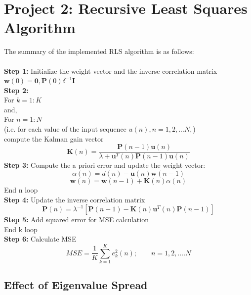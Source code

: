 \documentclass[journal]{IEEEtran}
\begin{document}
\section{Project 2: Recursive Least Squares Algorithm}
The summary of the implemented RLS algorithm is as follows:\\
\\
\textbf{Step 1:} Initialize the weight vector and the inverse correlation matrix
$\boldsymbol{w}(0) = \boldsymbol{0},  \boldsymbol{P}(0) \delta^{-1}\boldsymbol{I}$\\
\textbf{Step 2:}\\
For $k = 1:K$\\
and,\\
For $n = 1:N$\\
(i.e. for each value of the input sequence $u(n), n = 1,2,...N,$)
\\ \indent compute the Kalman gain vector
\begin{equation}
  \boldsymbol{K}(n)= \dfrac{\boldsymbol{P}(n-1)\boldsymbol{u}(n)}{\lambda+\boldsymbol{u}^T(n)\boldsymbol{P}(n-1)\boldsymbol{u}(n)}
\end{equation}
\indent \textbf{Step 3:} Compute the a priori error and update the weight vector:
\begin{equation}
  \alpha(n) = d(n) - \boldsymbol{u}(n)\boldsymbol{w}(n-1)
\end{equation}
\begin{equation}
  \boldsymbol{w}(n)= \boldsymbol{w}(n-1)+\boldsymbol{K}(n)\alpha(n)
\end{equation}
End n loop\\
\indent \textbf{Step 4:} Update the inverse correlation matrix
\begin{equation}
  \boldsymbol{P}(n)= \lambda^{-1}[\boldsymbol{P}(n-1)-\boldsymbol{K}(n)\boldsymbol{u}^T(n)\boldsymbol{P}(n-1)]
\end{equation}
\textbf{Step 5:} Add squared error for MSE calculation\\
End k loop\\
\textbf{Step 6:} Calculate MSE
\begin{equation}
  \label{eq:MSE}
  MSE=\dfrac{1}{K}\sum_{k=1}^{K}e_k^2(n); \qquad n = 1,2,....N
\end{equation}
\subsection{Effect of Eigenvalue Spread}
\end{document}

